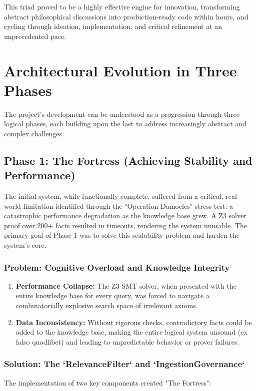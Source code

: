 \documentclass[11pt, a4paper]{article}
\begin{document}
This triad proved to be a highly effective engine for innovation, transforming abstract philosophical discussions into production-ready code within hours, and cycling through ideation, implementation, and critical refinement at an unprecedented pace.

\section{Architectural Evolution in Three Phases}
\label{sec:evolution}

The project's development can be understood as a progression through three logical phases, each building upon the last to address increasingly abstract and complex challenges.

\subsection{Phase 1: The Fortress (Achieving Stability and Performance)}
\label{subsec:fortress}

The initial system, while functionally complete, suffered from a critical, real-world limitation identified through the "Operation Damocles" stress test: a catastrophic performance degradation as the knowledge base grew. A Z3 solver proof over 200+ facts resulted in timeouts, rendering the system unusable. The primary goal of Phase 1 was to solve this scalability problem and harden the system's core.

\subsubsection{Problem: Cognitive Overload and Knowledge Integrity}
\begin{enumerate}
    \item \textbf{Performance Collapse:} The Z3 SMT solver, when presented with the entire knowledge base for every query, was forced to navigate a combinatorially explosive search space of irrelevant axioms.
    \item \textbf{Data Inconsistency:} Without rigorous checks, contradictory facts could be added to the knowledge base, making the entire logical system unsound (ex falso quodlibet) and leading to unpredictable behavior or prover failures.
\end{enumerate}

\subsubsection{Solution: The `RelevanceFilter` and `IngestionGovernance`}
The implementation of two key components created "The Fortress":
\end{document}
